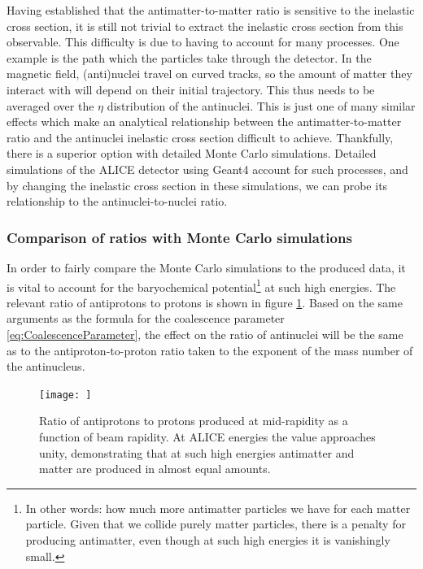 Having established that the antimatter-to-matter ratio is sensitive to the inelastic cross section, it is still not trivial to extract the inelastic cross section from this observable. This difficulty is due to having to account for many processes. One example is the path which the particles take through the detector. In the magnetic field, (anti)nuclei travel on curved tracks, so the amount of matter they interact with will depend on their initial trajectory. This thus needs to be averaged over the $\eta$ distribution of the antinuclei. This is just one of many similar effects which make an analytical relationship between the antimatter-to-matter ratio and the antinuclei inelastic cross section difficult to achieve. Thankfully, there is a superior option with detailed Monte Carlo simulations. Detailed simulations of the ALICE detector using Geant4 account for such processes, and by changing the inelastic cross section in these simulations, we can probe its relationship to the antinuclei-to-nuclei ratio.
\subsubsection{Comparison of ratios with Monte Carlo simulations}\label{sec:MCSim}
In order to fairly compare the Monte Carlo simulations to the produced data, it is vital to account for the baryochemical potential\footnote{In other words: how much more antimatter particles we have for each matter particle. Given that we collide purely matter particles, there is a penalty for producing antimatter, even though at such high energies it is vanishingly small.} at such high energies. The relevant ratio of antiprotons to protons is shown in figure \ref{fig:BaryochemicalPotential}. Based on the same arguments as the formula for the coalescence parameter \ref{eq:CoalescenceParameter}, the effect on the ratio of antinuclei will be the same as to the antiproton-to-proton ratio taken to the exponent of the mass number of the antinucleus. 

\begin{figure}
    \centering
    \texttt{[image: ]}
    \caption{Ratio of antiprotons to protons produced at mid-rapidity as a function of beam rapidity. At ALICE energies the value approaches unity, demonstrating that at such high energies antimatter and matter are produced in almost equal amounts.}
    \label{fig:BaryochemicalPotential}
\end{figure}
